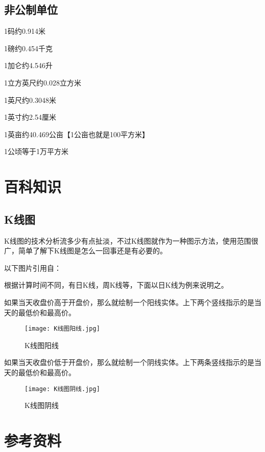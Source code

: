 \documentclass[12pt,oneside]{book}
\begin{document}
\section{非公制单位}
1码约0.914米

1磅约0.454千克

1加仑约4.546升

1立方英尺约0.028立方米

1英尺约0.3048米

1英寸约2.54厘米

1英亩约40.469公亩【1公亩也就是100平方米】

1公顷等于1万平方米

\chapter{百科知识}
\section{K线图}
K线图的技术分析流多少有点扯淡，不过K线图就作为一种图示方法，使用范围很广，简单了解下K线图是怎么一回事还是有必要的。

以下图片引用自\cite{从零开始学K线}：

根据计算时间不同，有日K线，周K线等，下面以日K线为例来说明之。

如果当天收盘价高于开盘价，那么就绘制一个阳线实体。上下两个竖线指示的是当天的最低价和最高价。

\begin{figure}[H]
\centering
\texttt{[image: K线图阳线.jpg]}
\caption{K线图阳线}
\end{figure}

如果当天收盘价低于开盘价，那么就绘制一个阴线实体。上下两条竖线指示的是当天的最低价和最高价。

\begin{figure}[H]
\centering
\texttt{[image: K线图阴线.jpg]}
\caption{K线图阴线}
\end{figure}


\backmatter
\chapter*{参考资料}
\end{document}
